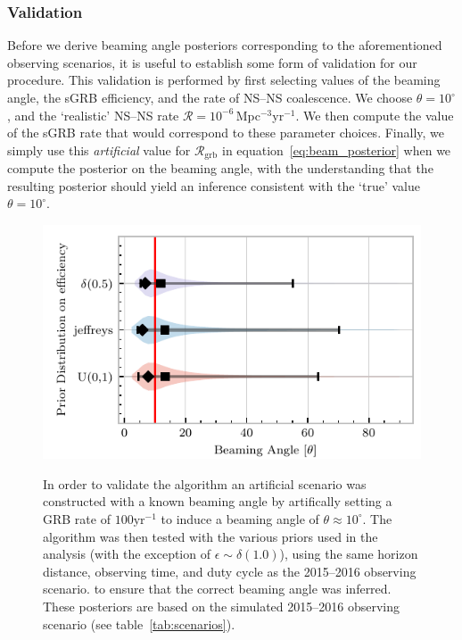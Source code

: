 \documentclass[twocolumn,nofootinbib]{revtex4-1}
\newcommand{\grbrate}{{{\mathcal R}_{\mathrm{grb}}}}
\newcommand{\cbcrate}{{{\mathcal R}}}
\newcommand{\yr}{\mathrm{yr}}
\newcommand{\BNS}{\ac{NS}--\ac{NS}\xspace}
\begin{document}
\subsubsection{Validation}
Before we derive beaming angle posteriors corresponding to the
aforementioned observing scenarios, it is useful to establish some
form of validation for our procedure.  This validation is performed by
first selecting values of the beaming angle, the \ac{sGRB} efficiency,
and the rate of \BNS coalescence.  We choose $\theta=10^{\circ}$, and
the `realistic' \BNS rate $\cbcrate = 10^{-6}$\,Mpc$^{-3}$yr$^{-1}$.
We then compute the value of the \ac{sGRB} rate that would correspond
to these parameter choices.  Finally, we simply use this
\emph{artificial} value for $\grbrate$ in
equation~\ref{eq:beam_posterior} when we compute the posterior on the
beaming angle, with the understanding that the resulting posterior
should yield an inference consistent with the `true' value
$\theta=10^{\circ}$.
%
\begin{figure}%
\centering
{\includegraphics[width=\linewidth]{O1_injections_violin.pdf}}
\caption{ In order to validate the algorithm an artificial scenario
  was constructed with a known beaming angle by artifically setting a
  GRB rate of $100 \yr^{-1}$ to induce a beaming angle of $\theta \approx 10^{\circ}$.
  The algorithm was then tested with the various priors used in the
  analysis (with the exception of $\epsilon \sim \delta(1.0)$), using
  the same horizon distance, observing time, and duty cycle as the 2015--2016
  observing scenario. to ensure that the correct beaming angle was inferred. 
  These posteriors are based on the simulated 2015--2016 observing scenario (see
  table~\ref{tab:scenarios}).
  \label{fig:injjetposterio2016}}
\end{figure}
\end{document}
